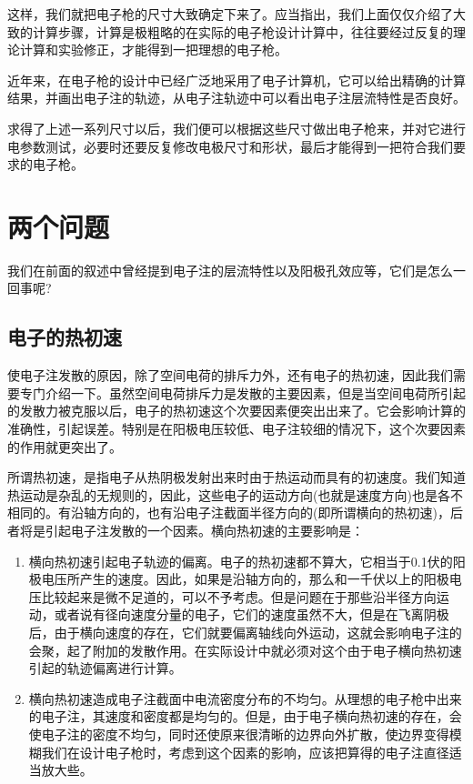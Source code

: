 这样，我们就把电子枪的尺寸大致确定下来了。应当指出，我们上面仅仅介绍了大致的计算步骤，计算是极粗略的在实际的电子枪设计计算中，往往要经过反复的理论计算和实验修正，才能得到一把理想的电子枪。

近年来，在电子枪的设计中已经广泛地采用了电子计算机，它可以给出精确的计算结果，并画出电子注的轨迹，从电子注轨迹中可以看出电子注层流特性是否良好。

求得了上述一系列尺寸以后，我们便可以根据这些尺寸做出电子枪来，并对它进行电参数测试，必要时还要反复修改电极尺寸和形状，最后才能得到一把符合我们要求的电子枪。


\section{两个问题}

我们在前面的叙述中曾经提到电子注的层流特性以及阳极孔效应等，它们是怎么一回事呢?

\subsection{电子的热初速}

使电子注发散的原因，除了空间电荷的排斥力外，还有电子的热初速，因此我们需要专门介绍一下。虽然空间电荷排斥力是发散的主要因素，但是当空间电荷所引起的发散力被克服以后，电子的热初速这个次要因素便突出出来了。它会影响计算的准确性，引起误差。特别是在阳极电压较低、电子注较细的情况下，这个次要因素的作用就更突出了。

所谓热初速，是指电子从热阴极发射出来时由于热运动而具有的初速度。我们知道热运动是杂乱的无规则的，因此，这些电子的运动方向(也就是速度方向)也是各不相同的。有沿轴方向的，也有沿电子注截面半径方向的(即所谓横向的热初速)，后者将是引起电子注发散的一个因素。横向热初速的主要影响是：

\begin{enumerate}
	\item 横向热初速引起电子轨迹的偏离。电子的热初速都不算大，它相当于0.1伏的阳极电压所产生的速度。因此，如果是沿轴方向的，那么和一千伏以上的阳极电压比较起来是微不足道的，可以不予考虑。但是问题在于那些沿半径方向运动，或者说有径向速度分量的电子，它们的速度虽然不大，但是在飞离阴极后，由于横向速度的存在，它们就要偏离轴线向外运动，这就会影响电子注的会聚，起了附加的发散作用。在实际设计中就必须对这个由于电子横向热初速引起的轨迹偏离进行计算。
	\item 横向热初速造成电子注截面中电流密度分布的不均匀。从理想的电子枪中出来的电子注，其速度和密度都是均匀的。但是，由于电子横向热初速的存在，会使电子注的密度不均匀，同时还使原来很清晰的边界向外扩散，使边界变得模糊我们在设计电子枪时，考虑到这个因素的影响，应该把算得的电子注直径适当放大些。
\end{enumerate}

